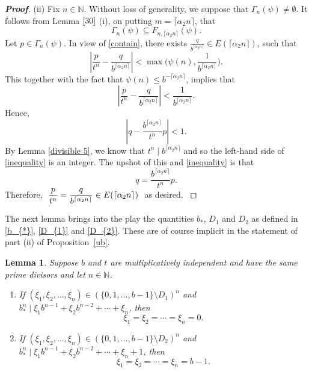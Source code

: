 \documentclass[12pt]{article}
\newtheorem{lemma}{Lemma}[section]
\theoremstyle{definition}
\theoremstyle{remark}
\begin{document}
\begin{proof}[\rm \textbf{Proof}]

\noindent  (ii) Fix $n\in\mathbb{N}$. Without loss of generality, we suppose that $\Gamma_{n}(\psi)\neq\emptyset$. It follows from Lemma $\ref{30}$ (i), on putting $m=\lceil \alpha_{2}n\rceil$,  that  
\begin{equation}\label{contain}
\Gamma_{n}(\psi)\subseteq F_{n,\lceil \alpha_{2}n\rceil}(\psi).
\end{equation}
 Let $p\in\Gamma_{n}(\psi)$. In view of \eqref{contain}, there exists $\frac{q}{b^{\lceil \alpha_{2}n\rceil}}\in E (\lceil\alpha_{2}n\rceil)$, such that
$$\left|\frac{p}{t^{n}}-\frac{q}{b^{\lceil \alpha_{2}n\rceil}}\right|<\max\Big(\psi(n),\frac{1}{b^{\lceil \alpha_{2}n\rceil}}\Big).$$
This together with the fact that $\psi(n)\leq b^{-\lceil \alpha_{2}n\rceil}$,  implies that
$$\left|\frac{p}{t^{n}}-\frac{q}{b^{\lceil \alpha_{2}n\rceil}}\right|<\frac{1}{b^{\lceil \alpha_{2}n\rceil}}.$$
Hence,
\begin{equation}\label{inequality}
\left|q-\frac{b^{\lceil \alpha_{2}n\rceil}}{t^{n}}p\right|<1.
\end{equation}
By Lemma \ref{divisible 5}, we know that $t^{n}\mid b^{\lceil \alpha_{2}n\rceil}$ and so the left-hand side of \eqref{inequality} is an integer. The upshot of this and \eqref{inequality} is that
$$q=\frac{b^{\lceil \alpha_{2}n\rceil}}{t^{n}}p.$$ Therefore,
$\ \displaystyle{\small{\frac{p}{t^{n}}=\frac{q}{b^{\lceil \alpha_{2}n\rceil}}  } \in E(\lceil\alpha_{2}n\rceil)}  \ $
as desired.
\textrm{}
\end{proof}


The next lemma brings into the play the quantities  $b_{*}$, $D_{1}$ and $D_{2}$  as  defined in \eqref{b_{*}}, \eqref{D_{1}} and \eqref{D_{2}}.  These are of course implicit in the statement of part (ii) of Proposition~\ref{ub}.
\begin{lemma}\label{32}
Suppose $b$ and $t$ are multiplicatively independent and have the same prime divisors  and let  $n\in\mathbb{N}$.

\begin{enumerate}
    \item[(i)] If $(\xi_{1},\xi_{2},\ldots,\xi_{n})\in(\{0,1,\ldots,b-1\}\setminus D_{1})^{n}$ and $b_{*}^{n}\mid\xi_{1}b^{n-1}+\xi_{2}b^{n-2} +\cdots+\xi_{n}$, then
\begin{equation*}
\xi_{1}=\xi_{2}=\cdots=\xi_{n}=0.
\end{equation*}
\item[(ii)]  If $(\xi_{1},\xi_{2},\ldots,\xi_{n})\in(\{0,1,\ldots,b-1\}\setminus D_{2})^{n}$ and 
$b_{*}^{n}\mid\xi_{1}b^{n-1}+\xi_{2}b^{n-2} +\cdots+\xi_{n}+1$, then
\begin{equation*}
\xi_{1}=\xi_{2}=\cdots=\xi_{n}=b-1.
\end{equation*}
\end{enumerate}
\end{lemma}
\end{document}
